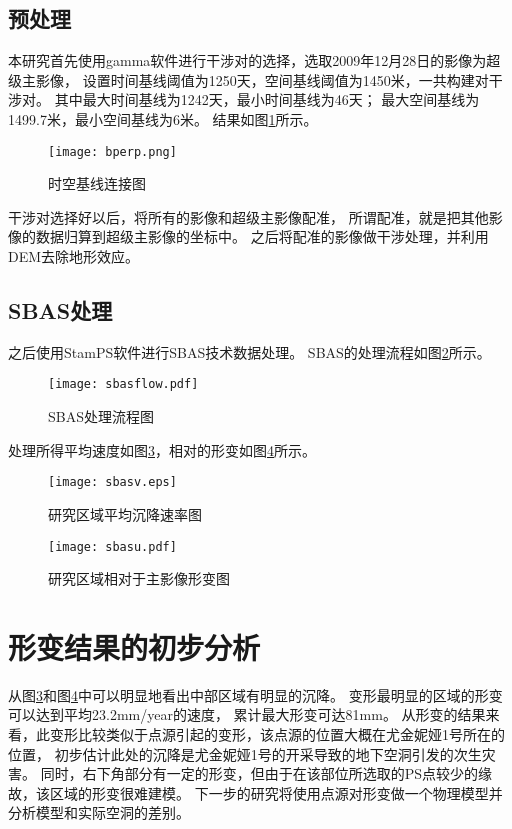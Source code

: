 \subsection{预处理}
本研究首先使用gamma软件进行干涉对的选择，选取2009年12月28日的影像为超级主影像，
设置时间基线阈值为1250天，空间基线阈值为1450米，一共构建对干涉对。
其中最大时间基线为1242天，最小时间基线为46天；
最大空间基线为1499.7米，最小空间基线为6米。
结果如图\ref{fig:bprep}所示。
\begin{figure}[htb]
    \centering
    \texttt{[image: bperp.png]}
    \caption{时空基线连接图}
    \label{fig:bprep}
\end{figure}

干涉对选择好以后，将所有的影像和超级主影像配准，
所谓配准，就是把其他影像的数据归算到超级主影像的坐标中。
之后将配准的影像做干涉处理，并利用DEM去除地形效应。

\subsection{SBAS处理}
之后使用StamPS软件进行SBAS技术数据处理。
SBAS的处理流程如图\ref{fig:sbasflow}所示。
\begin{figure}[htb]
    \centering
    \texttt{[image: sbasflow.pdf]}
    \caption{SBAS处理流程图}
    \label{fig:sbasflow}
\end{figure}

处理所得平均速度如图\ref{fig:sbasv}，相对的形变如图\ref{fig:sbasu}所示。
\begin{figure}[htb]
    \centering
    \texttt{[image: sbasv.eps]}
    \caption{研究区域平均沉降速率图}
    \label{fig:sbasv}
\end{figure}
\begin{figure}[htb]
    \centering
    \texttt{[image: sbasu.pdf]}
    \caption{研究区域相对于主影像形变图}
    \label{fig:sbasu}
\end{figure}

\section{形变结果的初步分析}
从图\ref{fig:sbasv}和图\ref{fig:sbasu}中可以明显地看出中部区域有明显的沉降。
变形最明显的区域的形变可以达到平均23.2mm/year的速度，
累计最大形变可达81mm。
从形变的结果来看，此变形比较类似于点源引起的变形，该点源的位置大概在尤金妮娅1号所在的位置，
初步估计此处的沉降是尤金妮娅1号的开采导致的地下空洞引发的次生灾害。
同时，右下角部分有一定的形变，但由于在该部位所选取的PS点较少的缘故，该区域的形变很难建模。
下一步的研究将使用点源对形变做一个物理模型并分析模型和实际空洞的差别。